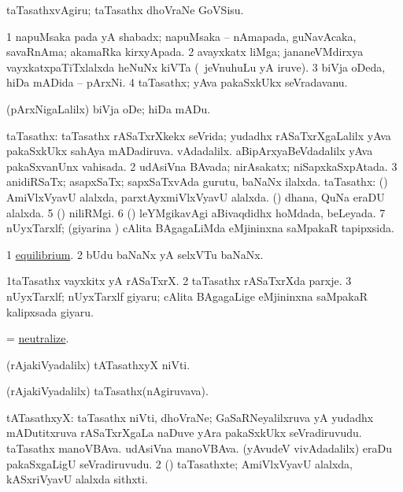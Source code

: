 \noindent
\gl{\pagu}
\bmng
{} taTasathxvAgiru; taTasathx dhoVraNe GoVSisu. 
\emng
\eentry

\bentry
{}
\gl{\nA}
\bmng
\bnum
\num{1} napuMsaka pada yA shabadx; napuMsaka -- nAmapada, guNavAcaka, savaRnAma; akamaRka kirxyApada. 
\num{2} avayxkatx liMga; jananeVMdirxya vayxkatxpaTiTxlalxda heNuNx kiVTa (\kanmu\ jeVnuhuLu yA iruve). 
\num{3} biVja oDeda, hiDa mADida -- pArxNi. 
\num{4} taTasathx; yAva pakaSxkUkx seVradavanu. 
\enum
\emng
\eentry

\bentry
{}
\gl{\sakirx}
\bmng
(pArxNigaLalilx) biVja oDe; hiDa mADu. 
\emng
\eentry

\bentry
{}
\gl{\gu}
\bmng
\bnum
{} taTasathx: 
\banum
{} taTasathx rASaTxrXkekx seVrida; yudadhx rASaTxrXgaLalilx yAva pakaSxkUkx sahAya mADadiruva. 
 vAdadalilx. aBipArxyaBeVdadalilx yAva pakaSxvanUnx vahisada. 
\eanum
\numie
\num{2} udAsiVna BAvada; nirAsakatx; niSapxkaSxpAtada. 
\num{3} anidiRSaTx; asapxSaTx; sapxSaTxvAda gurutu, baNaNx ilalxda. 
 taTasathx: 
\banum
{} (\ravi) AmiVlxVyavU alalxda, parxtAyxmiVlxVyavU alalxda. 
 (\viduyx) dhana, QuNa eraDU alalxda. 
\eanum
\numie
\num{5} (\savi) niliRMgi. 
\num{6} (\kiVvi) leYMgikavAgi aBivaqdidhx hoMdada, beLeyada. 
\num{7} nUyxTarxlf; (giyarina \vi) cAlita BAgagaLiMda eMjininxna saMpakaR tapipxsida. 
\enum
\emng

\noindent
\gl{\pagu}
\bmng
\bnum
\num{1}  \hyperref{kandict_e.pdf}{E}{equilibrium pagu(1)}{equilibrium}. 
\num{2}  bUdu baNaNx yA selxVTu baNaNx. 
\enum
\emng
\eentry

\bentry
{}
\gl{\nA}
\bmng
\bnum
\num{1}taTasathx vayxkitx yA rASaTxrX. 
\num{2} taTasathx rASaTxrXda parxje. 
\num{3} nUyxTarxlf; nUyxTarxlf giyaru; cAlita BAgagaLige eMjininxna saMpakaR kalipxsada giyaru. 
\enum
\emng
\eentry

\bentry
{}
\gl{\kirx}
\bmng
= \hyperlink{neutralize}{neutralize}. 
\emng
\eentry

\bentry
{}
\gl{\nA}
\bmng
(rAjakiVyadalilx) tATasathxyX niVti. 
\emng
\eentry

\bentry
{}
\gl{\nA}
\bmng
(rAjakiVyadalilx) taTasathx(nAgiruvava). 
\emng
\eentry

\bentry
{}
\gl{\nA}
\bmng
\bnum
{} tATasathxyX: 
\banum
{} taTasathx niVti, dhoVraNe; GaSaRNeyalilxruva yA yudadhx mADutitxruva rASaTxrXgaLa naDuve yAra pakaSxkUkx seVradiruvudu. 
 taTasathx manoVBAva. 
 udAsiVna manoVBAva. 
 (yAvudeV vivAdadalilx) eraDu pakaSxgaLigU seVradiruvudu. 
\eanum
\numie
\num{2} (\ravi) taTasathxte; AmiVlxVyavU alalxda, kASxriVyavU alalxda sithxti. 
\enum
\emng
\eentry

